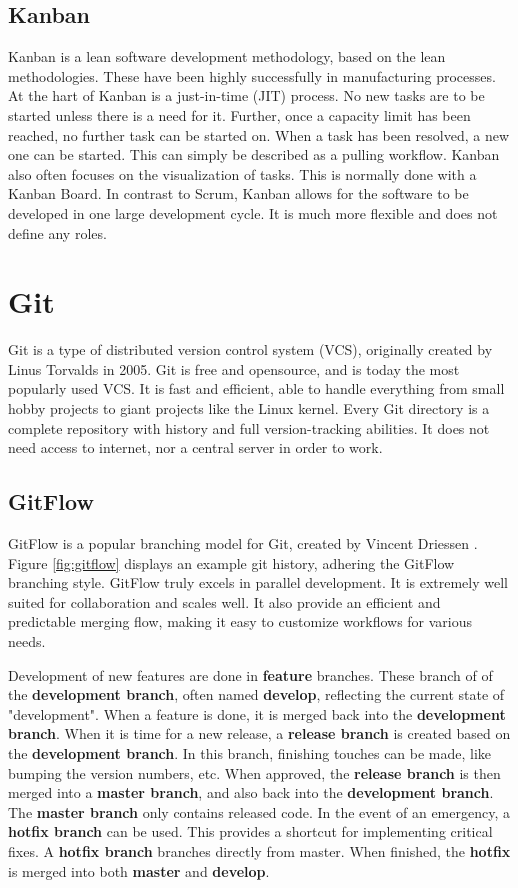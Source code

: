 \subsection{Kanban}
Kanban \cite{kanban} is a lean software development methodology, based on the lean methodologies. These have been highly successfully in manufacturing processes. At the hart of Kanban is a just-in-time (JIT) process. No new tasks are to be started unless there is a need for it. Further, once a capacity limit has been reached, no further task can be started on. When a task has been resolved, a new one can be started. This can simply be described as a pulling workflow. Kanban also often focuses on the visualization of tasks. This is normally done with a Kanban Board. In contrast to Scrum, Kanban allows for the software to be developed in one large development cycle. It is much more flexible and does not define any roles.

\section{Git}
Git\cite{git} is a type of distributed version control system (VCS), originally created by Linus Torvalds in 2005. Git is free and opensource, and is today the most popularly used VCS. It is fast and efficient, able to handle everything from small hobby projects to giant projects like the Linux kernel. Every Git directory is a complete repository with history and full version-tracking abilities. It does not need access to internet, nor a central server in order to work.

\subsection{GitFlow}
GitFlow is a popular branching model for Git, created by Vincent Driessen \cite{gitflow}. Figure \ref{fig:gitflow} displays an example git history, adhering the GitFlow branching style. GitFlow truly excels in parallel development. It is extremely well suited for collaboration and scales well. It also provide an efficient and predictable merging flow, making it easy to customize workflows for various needs.

Development of new features are done in \textbf{feature} branches. These branch of of the \textbf{development branch}, often named \textbf{develop}, reflecting the current state of "development". When a feature is done, it is merged back into the \textbf{development branch}. When it is time for a new release, a \textbf{release branch} is created based on the \textbf{development branch}. In this branch, finishing touches can be made, like bumping the version numbers, etc. When approved, the \textbf{release branch} is then merged into a \textbf{master branch}, and also back into the \textbf{development branch}. The \textbf{master branch} only contains released code. In the event of an emergency, a \textbf{hotfix branch} can be used. This provides a shortcut for implementing critical fixes. A \textbf{hotfix branch} branches directly from master. When finished, the \textbf{hotfix} is merged into both \textbf{master} and \textbf{develop}.

